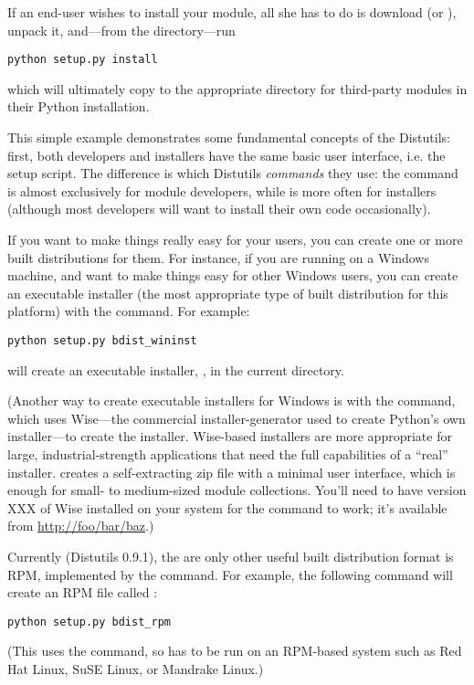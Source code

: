 \documentclass{howto}
\begin{document}
If an end-user wishes to install your  module, all she has
to do is download  (or ), unpack it,
and---from the  directory---run
\begin{verbatim}
python setup.py install
\end{verbatim}
which will ultimately copy  to the appropriate directory
for third-party modules in their Python installation.

This simple example demonstrates some fundamental concepts of the
Distutils: first, both developers and installers have the same basic
user interface, i.e. the setup script.  The difference is which
Distutils \emph{commands} they use: the  command is
almost exclusively for module developers, while  is
more often for installers (although most developers will want to install
their own code occasionally).

If you want to make things really easy for your users, you can create
one or more built distributions for them.  For instance, if you are
running on a Windows machine, and want to make things easy for other
Windows users, you can create an executable installer (the most
appropriate type of built distribution for this platform) with the
 command.  For example:
\begin{verbatim}
python setup.py bdist_wininst
\end{verbatim}
will create an executable installer, , in the
current directory.

(Another way to create executable installers for Windows is with the
 command, which uses Wise---the commercial
installer-generator used to create Python's own installer---to create
the installer.  Wise-based installers are more appropriate for large,
industrial-strength applications that need the full capabilities of a
``real'' installer.   creates a self-extracting
zip file with a minimal user interface, which is enough for small- to
medium-sized module collections.  You'll need to have version XXX of
Wise installed on your system for the  command to
work; it's available from \url{http://foo/bar/baz}.)

Currently (Distutils 0.9.1), the are only other useful built
distribution format is RPM, implemented by the 
command.  For example, the following command will create an RPM file
called :
\begin{verbatim}
python setup.py bdist_rpm
\end{verbatim}
(This uses the  command, so has to be run on an RPM-based
system such as Red Hat Linux, SuSE Linux, or Mandrake Linux.)
\end{document}
